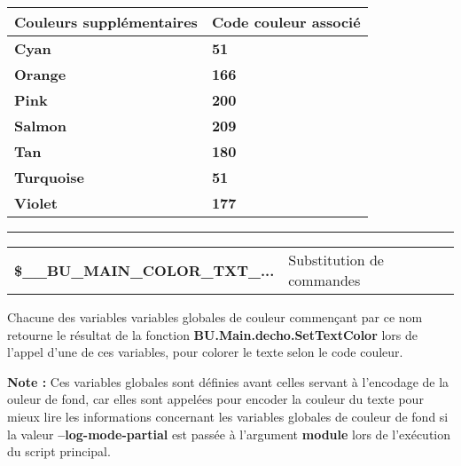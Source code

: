 \documentclass[a4paper,10pt]{article}
\begin{document}
\begin{justify}
    \begin{tabular}{|l|l|}
        \hline
        \textbf{Couleurs supplémentaires} & \textbf{Code couleur associé}\\
        \hline
        \textbf{\color{Cyan}Cyan} & \textbf{\color{Cyan}51}\\
        \hline
        \textbf{\color{Orange}Orange} & \textbf{\color{Orange}166}\\
        \hline
        \textbf{\color{Pink}Pink} & \textbf{\color{Pink}200}\\
        \hline
        \textbf{\color{Salmon}Salmon} & \textbf{\color{Salmon}209}\\
        \hline
        \textbf{\color{Tan}Tan} & \textbf{\color{Tan}180}\\
        \hline
        \textbf{\color{Turquoise}Turquoise} & \textbf{\color{Turquoise}51}\\
        \hline
        \textbf{\color{Violet}Violet} & \textbf{\color{Violet}177}\\
        \hline
    \end{tabular}
\end{justify}

\setlength{\parskip}{2em}


\par\noindent\rule{\textwidth}{0.4pt}

\setlength{\parskip}{1em}

\begin{justify}
    \begin{tabular}{l|l}
        \textbf{\color{vars}\$\_\_BU\_MAIN\_COLOR\_TXT\_...} & Substitution de commandes\\
    \end{tabular}
\end{justify}

\begin{justify}
    Chacune des variables variables globales de couleur commençant par ce nom retourne le résultat de la fonction \textbf{\color{func}BU.Main.decho.SetTextColor} lors de l'appel d'une de ces variables, pour colorer le texte selon le code couleur.
\end{justify}

\begin{justify}
    \textbf{Note :} Ces variables globales sont définies avant celles servant à l'encodage de la ouleur de fond, car elles sont appelées pour encoder la couleur du texte pour mieux lire les informations concernant les variables globales de couleur de fond si la valeur \textbf{--log-mode-partial} est passée à l'argument \textbf{module} lors de l'exécution du script principal.
\end{justify}
\end{document}
